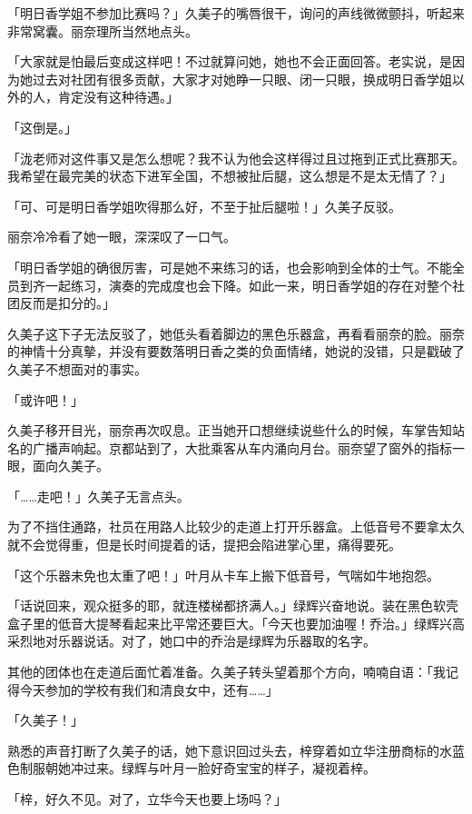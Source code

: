\documentclass[UTF8]{ctexart}
\begin{document}
    「明日香学姐不参加比赛吗？」久美子的嘴唇很干，询问的声线微微颤抖，听起来非常窝囊。丽奈理所当然地点头。 

    「大家就是怕最后变成这样吧！不过就算问她，她也不会正面回答。老实说，是因为她过去对社团有很多贡献，大家才对她睁一只眼、闭一只眼，换成明日香学姐以外的人，肯定没有这种待遇。」 

    「这倒是。」 

    「泷老师对这件事又是怎么想呢？我不认为他会这样得过且过拖到正式比赛那天。我希望在最完美的状态下进军全国，不想被扯后腿，这么想是不是太无情了？」 

    「可、可是明日香学姐吹得那么好，不至于扯后腿啦！」久美子反驳。 

    丽奈冷冷看了她一眼，深深叹了一口气。 

    「明日香学姐的确很厉害，可是她不来练习的话，也会影响到全体的士气。不能全员到齐一起练习，演奏的完成度也会下降。如此一来，明日香学姐的存在对整个社团反而是扣分的。」 

    久美子这下子无法反驳了，她低头看着脚边的黑色乐器盒，再看看丽奈的脸。丽奈的神情十分真摰，并没有要数落明日香之类的负面情绪，她说的没错，只是戳破了久美子不想面对的事实。 

    「或许吧！」 

    久美子移开目光，丽奈再次叹息。正当她开口想继续说些什么的时候，车掌告知站名的广播声响起。京都站到了，大批乘客从车内涌向月台。丽奈望了窗外的指标一眼，面向久美子。 

    「……走吧！」久美子无言点头。 

    为了不挡住通路，社员在用路人比较少的走道上打开乐器盒。上低音号不要拿太久就不会觉得重，但是长时间提着的话，提把会陷进掌心里，痛得要死。 

    「这个乐器未免也太重了吧！」叶月从卡车上搬下低音号，气喘如牛地抱怨。 

    「话说回来，观众挺多的耶，就连楼梯都挤满人。」绿辉兴奋地说。装在黑色软壳盒子里的低音大提琴看起来比平常还要巨大。「今天也要加油喔！乔治。」绿辉兴高采烈地对乐器说话。对了，她口中的乔治是绿辉为乐器取的名字。 

    其他的团体也在走道后面忙着准备。久美子转头望着那个方向，喃喃自语：「我记得今天参加的学校有我们和清良女中，还有……」 

    「久美子！」 

    熟悉的声音打断了久美子的话，她下意识回过头去，梓穿着如立华注册商标的水蓝色制服朝她冲过来。绿辉与叶月一脸好奇宝宝的样子，凝视着梓。 

    「梓，好久不见。对了，立华今天也要上场吗？」 
\end{document}
